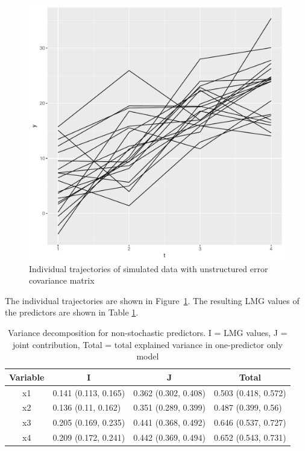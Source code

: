 \documentclass[11pt,a4paper,twoside]{book}
\makeatletter
\def\maxwidth{ %
  \ifdim\Gin@nat@width>\linewidth
    \linewidth
  \else
    \Gin@nat@width
  \fi
}
\newenvironment{knitrout}{}{} %
\makeatother
\begin{document}
\begin{knitrout}
\color{fgcolor}\begin{figure}
\includegraphics[width=\maxwidth]{figure/ch04_figsimdata_repeated_unstruct_plot-1} \caption[Individual trajectories of simulated data with unstructured error covariance matrix]{Individual trajectories of simulated data with unstructured error covariance matrix}\label{fig:simdata.repeated.unstruct.plot}
\end{figure}


\end{knitrout}




The individual trajectories are shown in Figure~\ref{fig:simdata.repeated.unstruct.plot}. The resulting LMG values of the predictors are shown in Table \ref{tbl:repeated.unstructured}.

\begin{table}[h]
\caption{Variance decomposition for non-stochastic predictors. I = LMG values, J = joint contribution, Total = total explained variance in one-predictor only model}
\centering
\begin{tabular}{clll}
  \toprule
  \multicolumn{1}{c}{\textbf{Variable}} & \multicolumn{1}{c}{\textbf{I}} &\multicolumn{1}{c}{\textbf{J}} & \multicolumn{1}{c}{\textbf{Total}} \\
  \hline
x1 & 0.141 (0.113, 0.165)  & 0.362 (0.302, 0.408)   & 0.503 (0.418, 0.572)  \\ 
x2 & 0.136 (0.11, 0.162)  & 0.351 (0.289, 0.399)   & 0.487 (0.399, 0.56)  \\ 
x3 & 0.205 (0.169, 0.235)  & 0.441 (0.368, 0.492)   & 0.646 (0.537, 0.727)  \\ 
x4 & 0.209 (0.172, 0.241)  & 0.442 (0.369, 0.494)   & 0.652 (0.543, 0.731)  \\ 
   \bottomrule
\end{tabular}
\label{tbl:repeated.unstructured}
\end{table}



 

\end{document}
